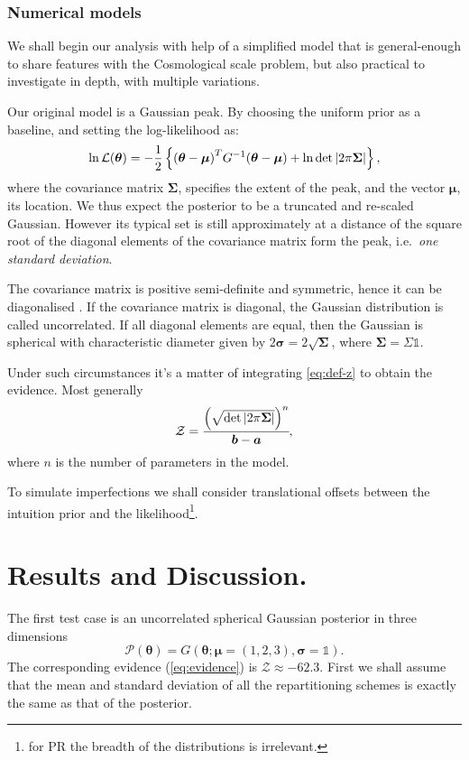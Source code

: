 \documentclass[usenatbib]{mnras}
\begin{document}
\subsubsection{Numerical models}

We shall begin our analysis with help of a simplified model that is
general-enough to share features with the Cosmological scale problem,
but also practical to investigate in depth, with multiple variations.

Our original model is a Gaussian peak. By choosing the uniform prior
as a baseline, and setting the log-likelihood as:
\begin{equation}
  \ln {\cal L}(\bm{\theta}) = - \dfrac{1}{2} \left\{{(\bm{\theta} - \bm{\mu})}^{T}G^{-1}(\bm{\theta}-\bm{\mu})  + \ln \det \left| 2\mathrm{\pi} \bm{\Sigma}\right| \right\},
\end{equation}
where the covariance matrix \(\bm{\Sigma}\), specifies the extent of
the peak, and the vector \(\bm{\mu}\), its location. We thus expect
the posterior to be a truncated and re-scaled Gaussian. However its
typical set is still approximately at a distance of the square root of
the diagonal elements of the covariance matrix form the peak,
i.e.~\emph{one standard deviation}.

The covariance matrix is positive semi-definite and symmetric, hence
it can be diagonalised \citep{taboga2017lectures}. If the covariance
matrix is diagonal, the Gaussian distribution is called
uncorrelated. If all diagonal elements are equal, then the Gaussian is
spherical with characteristic diameter given by
\(2\bm{\sigma} = 2\sqrt{\bm{\Sigma}}\), where \(\bm{\Sigma} = \Sigma \mathds{1}\).


Under such circumstances it's a matter of integrating \cref{eq:def-z}
to obtain the evidence. Most generally
\begin{equation}\label{eq:evidence}
   {\cal Z} = \cfrac{{\left( \sqrt{ \det \left| 2\mathrm{\pi} \bm{\Sigma} \right|} \right)}^{n}}{\bm{b}-\bm{a}}, 
\end{equation}
where \(n\) is the number of parameters in the model.

To simulate imperfections we shall consider translational offsets
between the intuition prior and the likelihood\footnote{for PR the
  breadth of the distributions is irrelevant.}.


\section{Results and Discussion.}\label{sec:org50493c6}
The first test case is an uncorrelated spherical Gaussian posterior
in three dimensions \[\mathcal{P}(\bm{\theta}) = G(\bm{\theta}; \bm{\mu} =
  (1,2,3),\bm{\sigma} = \mathds{1}).\] The corresponding evidence
(\cref{eq:evidence}) is \(\mathcal{Z}\approx-62.3\). First we shall
assume that the mean and standard deviation of all the
repartitioning schemes is exactly the same as that of the
posterior.
\end{document}

